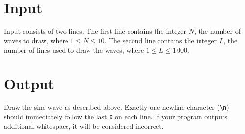 \section*{Input}
Input consists of two lines.
The first line contains the integer $N$, the number of waves to draw, where $1 \leq N \leq 10$.
The second line contains the integer $L$, the number of lines used to draw the waves, where $1 \leq L \leq 1\,000$.

\section*{Output}
Draw the sine wave as described above.
Exactly one newline character (\texttt{\textbackslash{}n}) should immediately follow the last \texttt{X} on each line.
If your program outputs additional whitespace, it will be considered incorrect.

